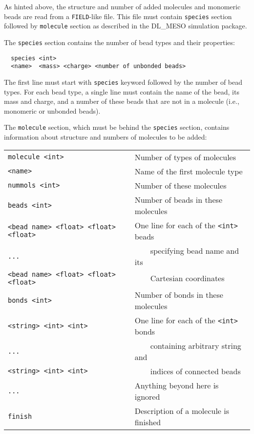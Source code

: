As hinted above, the structure and number of added molecules and monomeric
beads are read from a \texttt{FIELD}-like file. This file must contain
\texttt{species} section followed by \texttt{molecule} section as described
in the DL\_MESO simulation package.

The \texttt{species} section contains the number of bead types and their
properties:
\begin{verbatim}
  species <int>
  <name>  <mass> <charge> <number of unbonded beads>
\end{verbatim}
The first line must start with \texttt{species} keyword followed by the
number of bead types. For each bead type, a single line must contain the
name of the bead, its mass and charge, and a number of these beads that are
not in a molecule (i.e., monomeric or unbonded beads).

The \texttt{molecule} section, which must be behind the \texttt{species}
section, contains information about structure and numbers of molecules to
be added:

\noindent
\begin{longtable}{ll}
  \texttt{molecule <int>} & Number of types of molecules \\
  \texttt{<name>} & Name of the first molecule type \\
  \texttt{nummols <int>} & Number of these molecules \\
  \texttt{beads <int>} & Number of beads in these molecules \\
  \texttt{<bead name> <float> <float> <float>} & One line for each of the \texttt{<int>} beads \\
  \texttt{...} & \ \ \ \ specifying bead name and its \\
  \texttt{<bead name> <float> <float> <float>} & \ \ \ \ Cartesian coordinates \\
  \texttt{bonds <int>} & Number of bonds in these molecules \\
  \texttt{<string> <int> <int>} & One line for each of the \texttt{<int>} bonds \\
  \texttt{...} & \ \ \ \ containing arbitrary string and \\
  \texttt{<string> <int> <int>} & \ \ \ \ indices of connected beads \\
  \texttt{...} & Anything beyond here is ignored \\
  \texttt{finish} & Description of a molecule is finished \\
\end{longtable}

